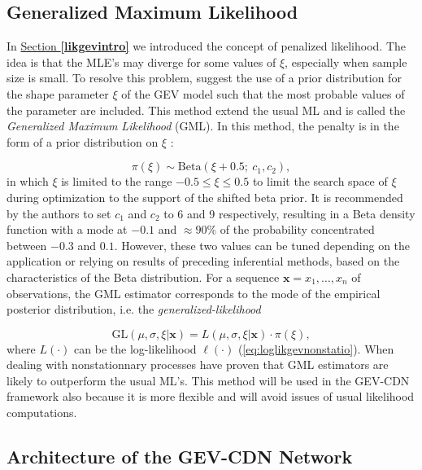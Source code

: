 \subsection{Generalized Maximum Likelihood}


In \hyperref[likgevintro]{Section \textbf{\ref{likgevintro}}} we introduced the concept of penalized likelihood. The idea is that the MLE's may diverge for some values of $\xi$, especially when sample size is small. To resolve this problem, \citet{martins_generalized_2000} suggest the use of a prior distribution for the shape parameter $\xi$ of the GEV model such
that the most probable values of the parameter are included. This method extend the usual ML and is called the \emph{Generalized Maximum Likelihood} (GML). In this method, the penalty is in the form of a prior distribution on $\xi$ : 

\begin{equation}
\pi(\xi)\sim\text{Beta}(\xi+0.5 ; \ c_1,c_2),
\end{equation}
in which $\xi$ is limited to the range $-0.5\leq\xi\leq 0.5$ to limit the search space of $\xi$ during optimization to the support of the shifted beta prior. It is recommended by the authors to set $c_1$ and $c_2$ to 6 and 9 respectively, resulting in a Beta density function with a mode at $-0.1$ and $\approx 90\%$ of the probability concentrated between $-0.3$ and $0.1$. However, these two values can be tuned depending on the application or relying on results of preceding inferential methods, based on the characteristics of the Beta distribution. For a sequence $\boldsymbol{x}=x_1,\ldots,x_n$ of observations, the GML estimator corresponds to the mode of the empirical posterior distribution, i.e. the \emph{generalized-likelihood}

\begin{equation}
\text{GL}(\mu, \sigma,\xi|\boldsymbol{x})=L(\mu,\sigma,\xi|\boldsymbol{x})\cdot \pi(\xi),
\end{equation}
where $L(\cdot)$ can be the log-likelihood $\ell(\cdot)$ (\ref{eq:loglikgevnonstatio}).
When dealing with nonstationnary processes \cite{el_adlouni_generalized_2007} have proven that GML estimators are likely to outperform the usual ML's. This method will be used in the GEV-CDN framework also because it is more flexible and will avoid issues of usual likelihood computations.


\subsection{Architecture of the GEV-CDN Network}



